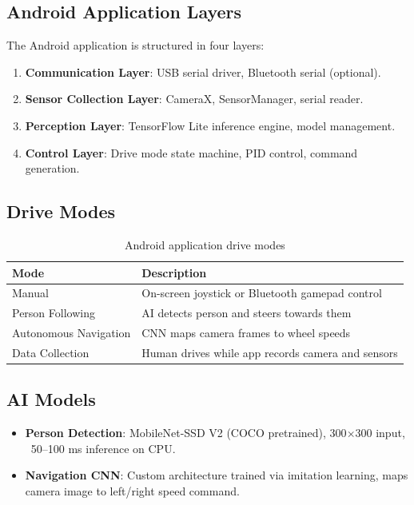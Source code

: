 \documentclass[12pt,a4paper]{article}
\begin{document}
\subsection{Android Application Layers}

The Android application is structured in four layers:

\begin{enumerate}
    \item \textbf{Communication Layer}: USB serial driver, Bluetooth serial (optional).
    \item \textbf{Sensor Collection Layer}: CameraX, SensorManager, serial reader.
    \item \textbf{Perception Layer}: TensorFlow Lite inference engine, model management.
    \item \textbf{Control Layer}: Drive mode state machine, PID control, command generation.
\end{enumerate}

\subsection{Drive Modes}

\begin{table}[h!]
\centering
\begin{tabular}{ll}
\toprule
\textbf{Mode} & \textbf{Description} \\
\midrule
Manual & On-screen joystick or Bluetooth gamepad control \\
Person Following & AI detects person and steers towards them \\
Autonomous Navigation & CNN maps camera frames to wheel speeds \\
Data Collection & Human drives while app records camera and sensors \\
\bottomrule
\end{tabular}
\caption{Android application drive modes}
\end{table}

\subsection{AI Models}

\begin{itemize}
    \item \textbf{Person Detection}: MobileNet-SSD V2 (COCO pretrained), 300$\times$300 input,
          ~50--100 ms inference on CPU.
    \item \textbf{Navigation CNN}: Custom architecture trained via imitation learning, maps
          camera image to left/right speed command.
\end{itemize}
\end{document}
